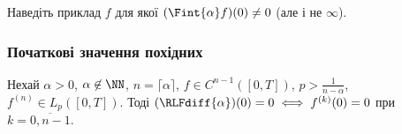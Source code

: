 \begin{exercise}
    Наведіть приклад $f$ для якої $(\Fint{\alpha} f)(0) \ne 0$ (але і не $\infty$).
\end{exercise}

\subsubsection{Початкові значення похідних}

\begin{theorem}
    Нехай $\alpha > 0$, $\alpha \not\in \NN$, $n = \lceil \alpha \rceil$, $f \in C^{n - 1}([0, T])$, $p > \frac{1}{n - \alpha}$, $f^{(n)} \in L_p([0, T])$. Тоді $(\RLFdiff{\alpha}) (0) = 0 \iff f^{(k)} (0) = 0$ при $k = \overline{0, n - 1}$.
\end{theorem}

